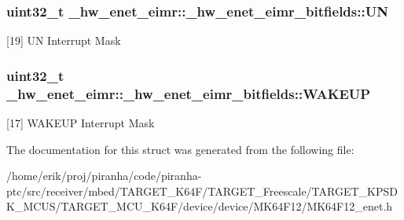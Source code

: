 \subsubsection[{\texorpdfstring{UN}{UN}}]{\setlength{\rightskip}{0pt plus 5cm}uint32\+\_\+t \+\_\+hw\+\_\+enet\+\_\+eimr\+::\+\_\+hw\+\_\+enet\+\_\+eimr\+\_\+bitfields\+::\+UN}\hypertarget{struct__hw__enet__eimr_1_1__hw__enet__eimr__bitfields_aadecff92067ceebca0bc05f89baae3eb}{}\label{struct__hw__enet__eimr_1_1__hw__enet__eimr__bitfields_aadecff92067ceebca0bc05f89baae3eb}
\mbox{[}19\mbox{]} UN Interrupt Mask 
\subsubsection[{\texorpdfstring{W\+A\+K\+E\+UP}{WAKEUP}}]{\setlength{\rightskip}{0pt plus 5cm}uint32\+\_\+t \+\_\+hw\+\_\+enet\+\_\+eimr\+::\+\_\+hw\+\_\+enet\+\_\+eimr\+\_\+bitfields\+::\+W\+A\+K\+E\+UP}\hypertarget{struct__hw__enet__eimr_1_1__hw__enet__eimr__bitfields_a0258a346fe2d4ee3c0eb06d996a9e8b2}{}\label{struct__hw__enet__eimr_1_1__hw__enet__eimr__bitfields_a0258a346fe2d4ee3c0eb06d996a9e8b2}
\mbox{[}17\mbox{]} W\+A\+K\+E\+UP Interrupt Mask 

The documentation for this struct was generated from the following file\+:\begin{DoxyCompactItemize}
\item 
/home/erik/proj/piranha/code/piranha-\/ptc/src/receiver/mbed/\+T\+A\+R\+G\+E\+T\+\_\+\+K64\+F/\+T\+A\+R\+G\+E\+T\+\_\+\+Freescale/\+T\+A\+R\+G\+E\+T\+\_\+\+K\+P\+S\+D\+K\+\_\+\+M\+C\+U\+S/\+T\+A\+R\+G\+E\+T\+\_\+\+M\+C\+U\+\_\+\+K64\+F/device/device/\+M\+K64\+F12/M\+K64\+F12\+\_\+enet.\+h\end{DoxyCompactItemize}
